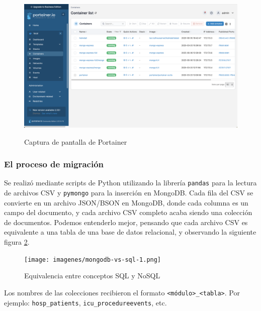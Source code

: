 \begin{figure}[H]
  \centering
  {\includegraphics[width=1\textwidth]{imagenes/screenshot3.png}}
  \caption{Captura de pantalla de Portainer}
  \label{fig:screenshot3}
\end{figure}


\subsubsection{El proceso de migración}

Se realizó mediante scripts de Python utilizando la librería \texttt{pandas} para la lectura de archivos CSV y \texttt{pymongo} para la inserción en MongoDB. Cada fila del CSV se convierte en un archivo JSON/BSON \cite{mongojsonbson} en MongoDB, donde cada columna es un campo del documento, y cada archivo CSV completo acaba siendo una colección de documentos. Podemos entenderlo mejor, pensando que cada archivo CSV es equivalente a una tabla de una base de datos relacional, y observando la siguiente figura \ref{fig:equivalenciasql}.

\begin{figure}[H]
  \centering
  {\texttt{[image: imagenes/mongodb-vs-sql-1.png]}}
  \caption{Equivalencia entre conceptos SQL y NoSQL \cite{equisqlfoto}}
  \label{fig:equivalenciasql}
\end{figure}

Los nombres de las colecciones recibieron el formato \texttt{\textless módulo\textgreater\_\textless tabla\textgreater}. Por ejemplo: \texttt{hosp\_patients}, \texttt{icu\_procedureevents}, etc.

